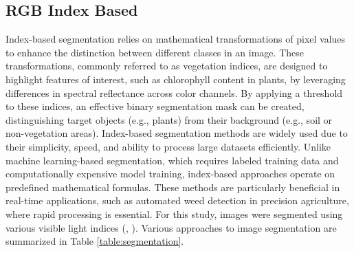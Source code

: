 \documentclass[letterpaper]{report}
\begin{document}
\subsection{RGB Index Based}
Index-based segmentation relies on mathematical transformations of pixel values to enhance the distinction between different classes in an image. These transformations, commonly referred to as vegetation indices, are designed to highlight features of interest, such as chlorophyll content in plants, by leveraging differences in spectral reflectance across color channels. By applying a threshold to these indices, an effective binary segmentation mask can be created, distinguishing target objects (e.g., plants) from their background (e.g., soil or non-vegetation areas). Index-based segmentation methods are widely used due to their simplicity, speed, and ability to process large datasets efficiently. Unlike machine learning-based segmentation, which requires labeled training data and computationally expensive model training, index-based approaches operate on predefined mathematical formulas. These methods are particularly beneficial in real-time applications, such as automated weed detection in precision agriculture, where rapid processing is essential.
For this study, images were segmented using various visible light indices (\cite{Hunt2013-ih}, \cite{Hamuda2016-dw}).  Various approaches to image segmentation are  summarized in Table \ref{table:segmentation}.  
\end{document}
